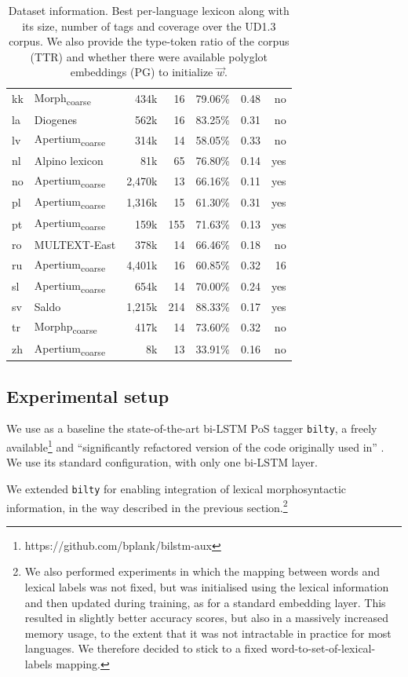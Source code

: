 \documentclass[11pt,letterpaper]{article}
\begin{document}
\begin{table}
\begin{tabular}{llrrr|rr}
kk & Morph\textsubscript{coarse}& 434k & 16 &  79.06\% & 0.48 & no\\
la  & Diogenes & 562k & 16 & 83.25\% & 0.31 &no\\
lv & Apertium\textsubscript{coarse} & 314k & 14  & 58.05\%  & 0.33& no \\
nl &  Alpino lexicon  & 81k & 65 & 76.80\% & 0.14&yes\\
no & Apertium\textsubscript{coarse} & 2,470k & 13 & 66.16\% & 0.11 & yes\\
pl & Apertium\textsubscript{coarse} & 1,316k &  15 & 61.30\% & 0.31 & yes\\
pt & Apertium\textsubscript{coarse} & 159k & 155 & 71.63\% & 0.13 & yes\\
ro &  MULTEXT-East  & 378k & 14 & 66.46\% & 0.18 & no \\
ru & Apertium\textsubscript{coarse} & 4,401k &16& 60.85\% & 0.32 & 16  \\
sl & Apertium\textsubscript{coarse} & 654k & 14 & 70.00\% & 0.24 &yes\\
sv & Saldo & 1,215k & 214 & 88.33\% & 0.17 & yes\\
tr & Morphp\textsubscript{coarse} & 417k & 14 & 73.60\% & 0.32  &no \\
zh & Apertium\textsubscript{coarse} & 8k & 13 & 33.91\% & 0.16 & no \\

\bottomrule
\end{tabular}
\caption{Dataset information. Best per-language lexicon along with its size, number of tags and coverage over the UD1.3 corpus. We also provide the type-token ratio of the corpus (TTR) and whether there were available polyglot embeddings (PG) to initialize $\vec{w}$.}\label{tbl:lex}
\end{table}

\subsection{Experimental setup}

We use as a baseline the state-of-the-art bi-LSTM PoS tagger \texttt{bilty}, a freely
available\footnote{https://github.com/bplank/bilstm-aux} and ``significantly refactored version of the code
originally used in'' \cite{plank16}. We use its standard configuration, with only one bi-LSTM layer.

We extended \texttt{bilty} for enabling integration of lexical morphosyntactic information, in the way described in the
previous section.\footnote{We also performed experiments in which the mapping between words and lexical labels was not
  fixed, but was initialised using the lexical information and then updated during training, as for a standard embedding
  layer. This resulted in slightly better accuracy scores, but also in a massively increased memory usage, to the extent
  that it was not intractable in practice for most languages. We therefore decided to stick to a fixed
  word-to-set-of-lexical-labels mapping.}
\end{document}

